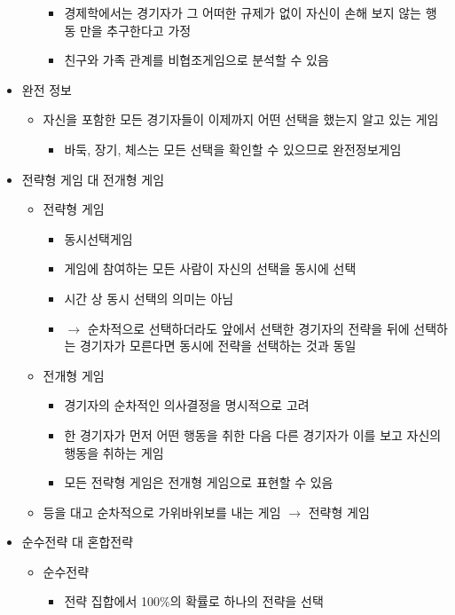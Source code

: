 \begin{itemize}
\begin{itemize}
		\begin{itemize}
		\item 경제학에서는 경기자가 그 어떠한 규제가 없이 자신이 손해 보지 않는 행동 만을 추구한다고 가정
		\item 친구와 가족 관계를 비협조게임으로 분석할 수 있음
		\end{itemize}
	\end{itemize}	
\item 완전 정보
	\begin{itemize}
	\item 자신을 포함한 모든 경기자들이 이제까지 어떤 선택을 했는지 알고 있는 게임
		\begin{itemize}
		\item 바둑, 장기, 체스는 모든 선택을 확인할 수 있으므로 완전정보게임
		\end{itemize}
	\end{itemize}	
\item 전략형 게임 대 전개형 게임
	\begin{itemize}
	\item 전략형 게임
		\begin{itemize}
		\item 동시선택게임
		\item 게임에 참여하는 모든 사람이 자신의 선택을 동시에 선택
		\item 시간 상 동시 선택의 의미는 아님 
		\item $\rightarrow$ 순차적으로 선택하더라도 앞에서 선택한 경기자의 전략을 뒤에 선택하는 경기자가 모른다면 동시에 전략을 선택하는 것과 동일
		\end{itemize}
	\item 전개형 게임
		\begin{itemize}
		\item 경기자의 순차적인 의사결정을 명시적으로 고려
		\item 한 경기자가 먼저 어떤 행동을 취한 다음 다른 경기자가 이를 보고 자신의 행동을 취하는 게임
		\item 모든 전략형 게임은 전개형 게임으로 표현할 수 있음
		\end{itemize}	
	\item 등을 대고 순차적으로 가위바위보를 내는 게임 $\rightarrow$ 전략형 게임	
	\end{itemize}	
\item 순수전략 대 혼합전략
	\begin{itemize}
	\item 순수전략
		\begin{itemize}
		\item 전략 집합에서 100\%의 확률로 하나의 전략을 선택

\end{itemize}
\end{itemize}
\end{itemize}
